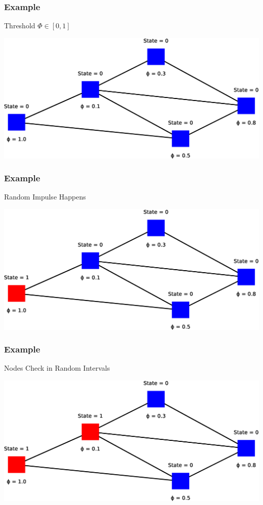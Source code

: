 \begin{frame}
    \frametitle{Example}
    \begin{itemize}
        \gitem Threshold $\Phi \in [0, 1]$
    \end{itemize}
    \vspace{8pt}
    \includegraphics[width=\textwidth]{img/model4}
    \vfill
\end{frame}

\begin{frame}
    \frametitle{Example}
    \begin{itemize}
        \gitem Random Impulse Happens
    \end{itemize}
    \vspace{8.6pt}
    \includegraphics[width=\textwidth]{img/model5}
    \vfill
\end{frame}

\begin{frame}
    \frametitle{Example}
    \begin{itemize}
        \gitem Nodes Check in Random Intervals
    \end{itemize}
    \vspace{10.8pt}
    \includegraphics[width=\textwidth]{img/model6}
    \vfill
\end{frame}

